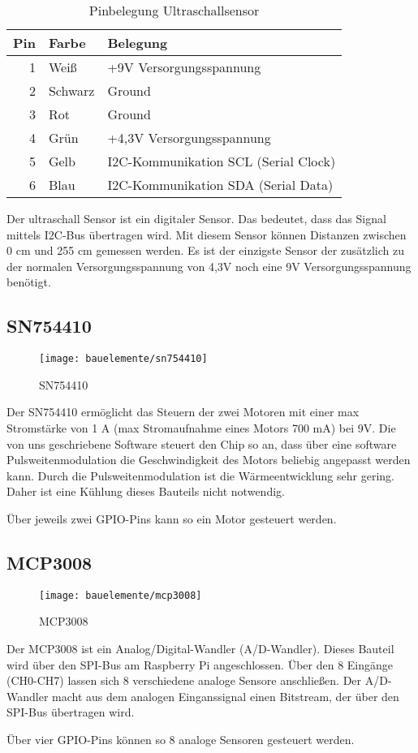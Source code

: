 \begin{table}[!ht]
\centering
\rmfamily
\caption{Pinbelegung Ultraschallsensor}
\renewcommand{\arraystretch}{1.1}
\sffamily
\begin{footnotesize}
\begin{tabular}{r | l l}
\toprule
\textbf{Pin} & \textbf{Farbe}  & \textbf{Belegung}\\
\midrule
1 & Weiß & +9V Versorgungsspannung \\
2 & Schwarz & Ground \\
3 & Rot & Ground \\
4 & Grün & +4,3V Versorgungsspannung \\
5 & Gelb & I2C-Kommunikation SCL (Serial Clock) \\
6 & Blau & I2C-Kommunikation SDA (Serial Data) \\
\bottomrule
\end{tabular}
\end{footnotesize}
\label{eb:ultraschall:tbl}
\end{table}

Der ultraschall Sensor ist ein digitaler Sensor. Das bedeutet, dass das Signal mittels I2C-Bus übertragen wird. Mit diesem Sensor können Distanzen zwischen  0 cm und 255 cm gemessen werden. Es ist der einzigste Sensor der zusätzlich zu der normalen Versorgungsspannung von 4,3V noch eine 9V Versorgungsspannung benötigt.

\subsection{SN754410}\label{eb:pwm}
\begin{wrapfigure}{r}{0.65\textwidth}
\texttt{[image: bauelemente/sn754410]}
\caption{SN754410}
\label{eb:fig:sn754410}
\end{wrapfigure}
Der SN754410 ermöglicht das Steuern der zwei Motoren mit einer max Stromstärke von 1 A (max Stromaufnahme eines Motors 700 mA) bei 9V. Die von uns  geschriebene Software steuert den Chip so an, dass über eine software Pulsweitenmodulation die Geschwindigkeit des Motors beliebig angepasst werden kann. Durch die Pulsweitenmodulation ist die Wärmeentwicklung sehr gering. Daher ist eine Kühlung dieses Bauteils nicht notwendig.

Über jeweils zwei GPIO-Pins kann so ein Motor gesteuert werden.

\subsection{MCP3008}\label{eb:adwandler}
\begin{wrapfigure}{r}{0.4\textwidth}
\texttt{[image: bauelemente/mcp3008]}
\caption{MCP3008}
\label{eb:mcp3008}
\end{wrapfigure}
Der MCP3008 ist ein Analog/Digital-Wandler (A/D-Wandler). Dieses Bauteil wird über den SPI-Bus am Raspberry Pi angeschlossen. Über den 8 Eingänge (CH0-CH7) lassen sich 8 verschiedene analoge Sensore anschließen. Der A/D-Wandler macht aus dem analogen Einganssignal einen Bitstream, der über den SPI-Bus übertragen wird.

Über vier GPIO-Pins können so 8 analoge Sensoren gesteuert werden.
